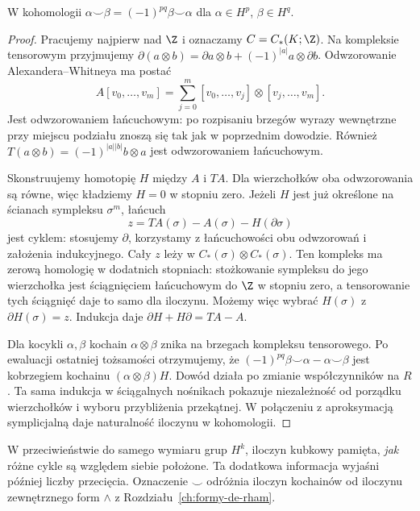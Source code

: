 \begin{stwierdzenie}
\label{prop:kubek-graded-16}
W kohomologii
$\alpha\smile\beta
=(-1)^{pq}\beta\smile\alpha$
dla $\alpha\in H^p$,
$\beta\in H^q$.
\end{stwierdzenie}
\begin{proof}
Pracujemy najpierw nad $\Z$ i oznaczamy $C=C_*(K;\Z)$.
Na kompleksie tensorowym przyjmujemy
$\partial(a\otimes b)=\partial a\otimes b+(-1)^{|a|}a\otimes\partial b$.
Odwzorowanie Alexandera--Whitneya ma postać
\[
 A[v_0,\ldots,v_m]
 =\sum_{j=0}^m[v_0,\ldots,v_j]\otimes[v_j,\ldots,v_m].
\]
Jest odwzorowaniem łańcuchowym: po rozpisaniu brzegów
wyrazy wewnętrzne przy miejscu podziału znoszą się
tak jak w poprzednim dowodzie. Również
$T(a\otimes b)=(-1)^{|a||b|}b\otimes a$
jest odwzorowaniem łańcuchowym.

Skonstruujemy homotopię $H$ między $A$ i $TA$.
Dla wierzchołków oba odwzorowania są równe, więc
kładziemy $H=0$ w stopniu zero. Jeżeli $H$ jest
już określone na ścianach sympleksu $\sigma^m$,
łańcuch
\[
 z=TA(\sigma)-A(\sigma)-H(\partial\sigma)
\]
jest cyklem: stosujemy $\partial$, korzystamy
z łańcuchowości obu odwzorowań i założenia indukcyjnego.
Cały $z$ leży w $C_*(\sigma)\otimes C_*(\sigma)$.
Ten kompleks ma zerową homologię w dodatnich stopniach:
stożkowanie sympleksu do jego wierzchołka jest
ściągnięciem łańcuchowym do $\Z$ w stopniu zero,
a tensorowanie tych ściągnięć daje to samo dla iloczynu.
Możemy więc wybrać $H(\sigma)$ z $\partial H(\sigma)=z$.
Indukcja daje $\partial H+H\partial=TA-A$.

Dla kocykli $\alpha,\beta$ kochain
$\alpha\otimes\beta$ znika na brzegach kompleksu
tensorowego. Po ewaluacji ostatniej tożsamości
otrzymujemy, że
$(-1)^{pq}\beta\smile\alpha-\alpha\smile\beta$
jest kobrzegiem kochainu $(\alpha\otimes\beta)H$.
Dowód działa po zmianie współczynników na $R$.
Ta sama indukcja w ściągalnych nośnikach pokazuje
niezależność od porządku wierzchołków i wyboru
przybliżenia przekątnej. W połączeniu z aproksymacją
symplicjalną daje naturalność iloczynu w kohomologii.
\end{proof}

W przeciwieństwie do samego wymiaru
grup $H^k$, iloczyn kubkowy pamięta,
\emph{jak} różne cykle są względem siebie
położone. Ta dodatkowa informacja
wyjaśni później liczby przecięcia.
Oznaczenie $\smile$ odróżnia
iloczyn kochainów od iloczynu
zewnętrznego form $\wedge$ z
Rozdziału~\ref{ch:formy-de-rham}.

